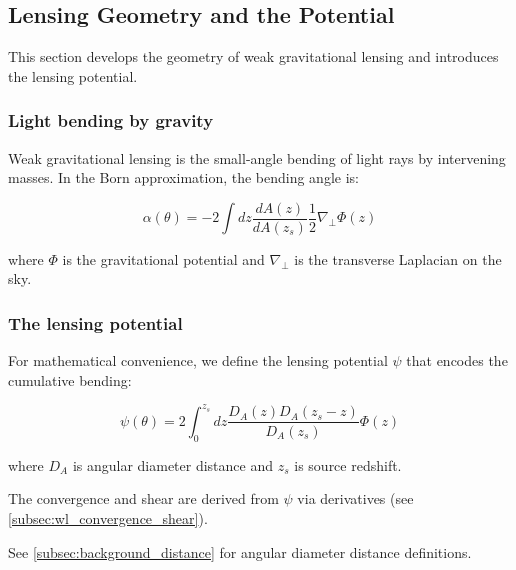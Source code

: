 \subsection{Lensing Geometry and the Potential}\label{subsec:wl_geometry}

This section develops the geometry of weak gravitational lensing and introduces the lensing potential.

\subsubsection{Light bending by gravity}

Weak gravitational lensing is the small-angle bending of light rays by intervening masses. In the Born approximation, the bending angle is:

\begin{equation}
\alpha(\theta) = -2 \int dz \frac{dA(z)}{dA(z_s)} \frac{1}{2} \nabla_\perp \Phi(z)
\end{equation}

where $\Phi$ is the gravitational potential and $\nabla_\perp$ is the transverse Laplacian on the sky.

\subsubsection{The lensing potential}

For mathematical convenience, we define the lensing potential $\psi$ that encodes the cumulative bending:

\begin{equation}
\psi(\theta) = 2 \int_0^{z_s} dz \frac{D_A(z) D_A(z_s - z)}{D_A(z_s)} \Phi(z)
\end{equation}

where $D_A$ is angular diameter distance and $z_s$ is source redshift.

The convergence and shear are derived from $\psi$ via derivatives (see \cref{subsec:wl_convergence_shear}).


See \cref{subsec:background_distance} for angular diameter distance definitions.
